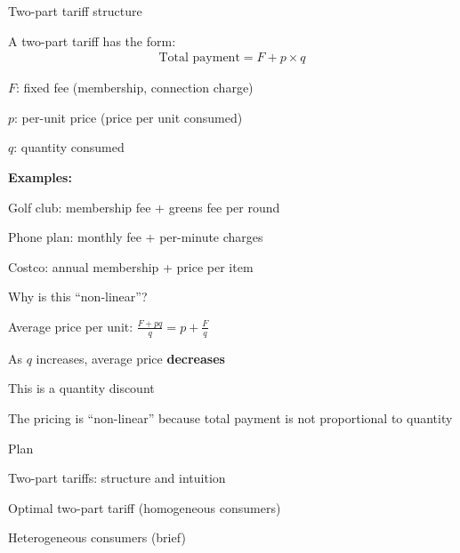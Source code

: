 \documentclass[notes,11pt, aspectratio=169]{beamer}
\newenvironment{wideitemize}{\itemize\addtolength{\itemsep}{10pt}}{\enditemize}
\newenvironment{wideenumerate}{\enumerate\addtolength{\itemsep}{10pt}}{\endenumerate}
\begin{document}
\begin{frame}{Two-part tariff structure}
	\begin{wideitemize}
		\item A two-part tariff has the form:
		\begin{align*}
			\text{Total payment} = F + p \times q
		\end{align*}
		\item $F$: fixed fee (membership, connection charge)
		\item $p$: per-unit price (price per unit consumed)
		\item $q$: quantity consumed
		\item \textbf{Examples:}
		\begin{wideitemize}
			\vspace{5pt}
			\item Golf club: membership fee + greens fee per round
			\item Phone plan: monthly fee + per-minute charges
			\item Costco: annual membership + price per item
		\end{wideitemize}
	\end{wideitemize}
\end{frame}

\begin{frame}{Why is this ``non-linear''?}
	\begin{wideitemize}
		\item Average price per unit: $\frac{F + pq}{q} = p + \frac{F}{q}$
		\item As $q$ increases, average price \textbf{decreases}
		\item This is a quantity discount
		\item The pricing is ``non-linear'' because total payment is not proportional to quantity
	\end{wideitemize}
\end{frame}

\begin{frame}{Plan}
  \begin{wideenumerate}
    \item Two-part tariffs: structure and intuition
    \item Optimal two-part tariff (homogeneous consumers)
    \item Heterogeneous consumers (brief)
  \end{wideenumerate}
\end{frame}
\end{document}
